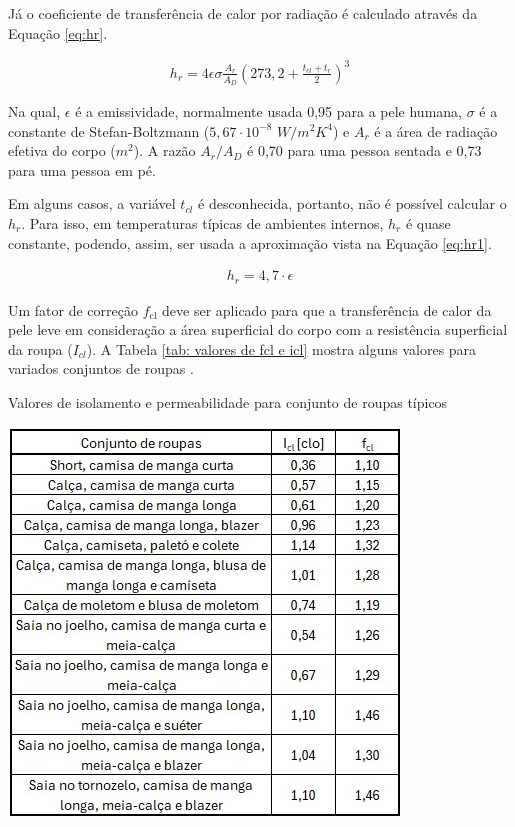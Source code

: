 \documentclass[acronym,symbols,table]{fei}
\begin{document}
Já o coeficiente de transferência de calor por radiação é calculado através da Equação \ref{eq:hr}.

\begin{equation} \label{eq:hr}
    \begin{aligned}
   h_{r}=4 \epsilon \sigma \frac{A_{r}}{A_{D}}(273,2 + \frac{t_{cl}+t_{r}}{2})^3
    \end{aligned}
\end{equation}

Na qual, $\epsilon$ é a emissividade, normalmente usada 0,95 para a pele humana, $\sigma$ é a constante de Stefan-Boltzmann ($5,67\cdot10^{-8}$ $W/m^{2}K^{4}$) e $A_{r}$ é a área de radiação efetiva do corpo ($m^2$). A razão $A_{r}/A_{D}$ é 0,70 para uma pessoa sentada e 0,73 para uma pessoa em pé.

Em alguns casos, a variável $t_{cl}$ é desconhecida, portanto, não é possível calcular o $h_{r}$. Para isso, em temperaturas típicas de ambientes internos, $h_{r}$ é quase constante, podendo, assim, ser usada a aproximação vista na Equação \ref{eq:hr1}.

\begin{equation} \label{eq:hr1}
    \begin{aligned}
   h_{r}=4,7\cdot \epsilon
    \end{aligned}
\end{equation}


Um fator de correção $f_{\text{cl}}$ deve ser aplicado para que a transferência de calor da pele leve em consideração a área superficial do corpo com a resistência superficial da roupa ($I_{cl}$). A Tabela \ref{tab: valores de fcl e icl} mostra alguns valores para variados conjuntos de roupas \cite{mccullough1989data}.

\begin{table}[!htb] 
 \centering
    \caption{Valores de isolamento e permeabilidade para conjunto de roupas típicos}
    \includegraphics[width=0.5\linewidth]{Tabelas/tabela-roupas.jpeg}
    \label{tab: valores de fcl e icl}
\end{table}
\end{document}
